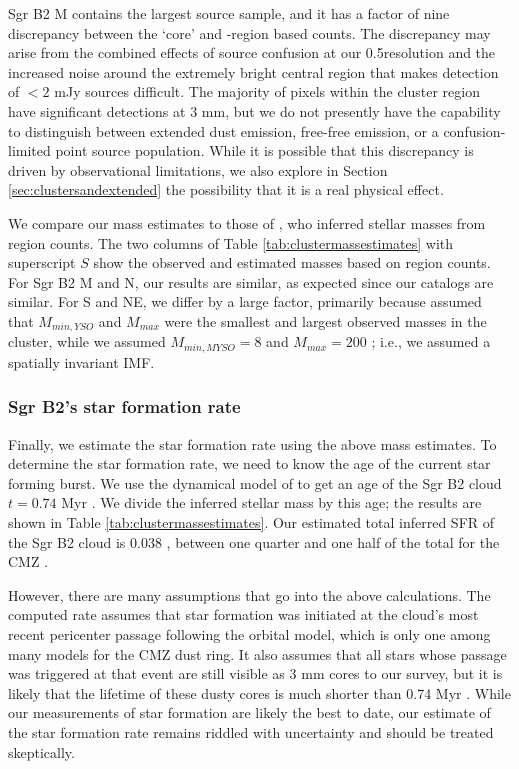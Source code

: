 \documentclass[twocolumn]{aastex61}
\begin{document}
Sgr B2 M contains the largest source sample, and it has a factor of nine
discrepancy between the `core' and \HII-region based counts. The discrepancy
may arise from the combined effects of source
confusion at our 0.5\arcsec resolution and the increased noise around the
extremely bright central region that makes detection of $<2$ mJy sources
difficult.  The majority of pixels within the cluster region have significant
detections at 3 mm, but we do not presently have the capability to distinguish
between extended dust emission, free-free emission, or a confusion-limited
point source population.  While it is possible that this discrepancy
is driven by observational limitations, we also explore in Section
\ref{sec:clustersandextended} the possibility that it is a real physical
effect.

We compare our mass estimates to those of \citet{Schmiedeke2016a}, who inferred
stellar masses from \hii region counts.  The  two columns of Table
\ref{tab:clustermassestimates} with superscript $S$ show the observed and
estimated masses based on
\hii region counts.  For Sgr B2 M and N, our results are similar, as expected
since our catalogs are similar.  For S and NE, we differ by a large factor,
primarily because \citet{Schmiedeke2016a} assumed that $M_{min,YSO}$ and $M_{max}$
were the smallest and largest observed masses in the cluster, while we assumed
$M_{min,MYSO}=8$ \msun and $M_{max}=200$ \msun; i.e., we assumed a spatially
invariant IMF.



\subsubsection{Sgr B2's star formation rate}
Finally, we estimate the star formation rate using the above mass estimates.
To determine the star formation rate, we need to know the age of the current
star forming burst.  We use the dynamical model of \citet{Kruijssen2015a} to
get an age of the Sgr B2 cloud $t=0.74$ Myr \citep{Longmore2013a}.  We divide
the inferred stellar mass by this age; the results are shown in Table
\ref{tab:clustermassestimates}.    Our estimated total inferred SFR of the Sgr
B2 cloud is 0.038 \msun \peryr, between one quarter and one half of the total
for the CMZ \citep{Longmore2013a,Barnes2017b}.  

However, there are many assumptions that go into the above calculations.  The
computed rate assumes that star formation was initiated at the cloud's most
recent pericenter passage following the \citet{Kruijssen2015a} orbital model,
which is only one among many models for the CMZ dust ring.  It also assumes
that all stars whose passage was triggered at that event are still visible as 3
mm cores to our survey, but it is likely that the lifetime of these dusty cores
is much shorter than 0.74 Myr \citep[for example, low-mass cores have lifetimes
closer to 0.1 Myr][]{Evans2009a}.  While our measurements of star formation are
likely the best to date, our estimate of the star formation rate remains
riddled with uncertainty and should be treated skeptically.
\end{document}
